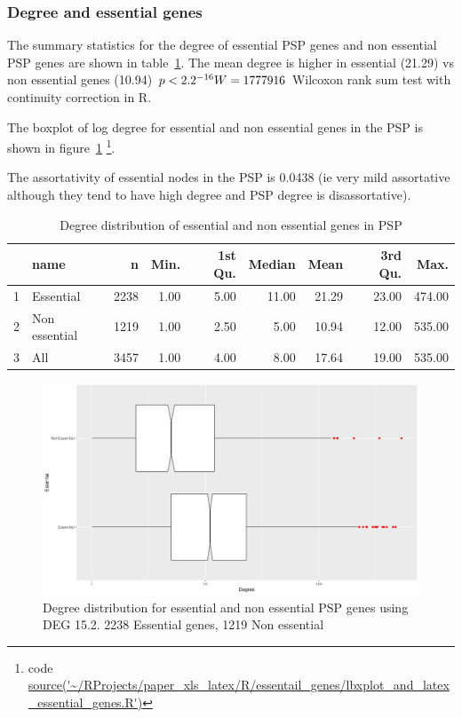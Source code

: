 \subsubsection{Degree and essential genes}

The summary statistics for the degree of essential PSP genes and non essential PSP genes are shown in table~\ref{tab:degree distribution essential and non essential genes PSP}. The mean degree is higher in essential (21.29) vs non essential genes (10.94) $p<2.2 \time 10^{-16}   W=1777916$ Wilcoxon rank sum test with continuity correction in R.

The boxplot of log degree for essential and non essential genes in the PSP is shown in figure~\ref{fig:boxplot_log degree essential genes}
\footnote{code \url{source('~/RProjects/paper_xls_latex/R/essentail_genes/lbxplot_and_latex_essential_genes.R')}}.

The assortativity of essential nodes in the PSP is 0.0438 (ie very mild assortative although they tend to have high degree and PSP degree is disassortative).


\begin{table}[ht]
\centering
\begin{tabular}{rlrrrrrrr}
  \hline
 & name & n & Min. & 1st Qu. & Median & Mean & 3rd Qu. & Max. \\ 
  \hline
1 & Essential & 2238 & 1.00 & 5.00 & 11.00 & 21.29 & 23.00 & 474.00 \\ 
  2 & Non essential & 1219 & 1.00 & 2.50 & 5.00 & 10.94 & 12.00 & 535.00 \\ 
  3 & All & 3457 & 1.00 & 4.00 & 8.00 & 17.64 & 19.00 & 535.00 \\ 
   \hline
\end{tabular}
\caption{Degree distribution of essential and non essential genes in PSP}
\label{tab:degree distribution essential and non essential genes PSP}
\end{table}

\begin{figure}
    \centering
    \includegraphics[width=\textwidth]{images/Rplot_essential_non_essential_gene_degree.png}
    \caption{Degree distribution for essential and non essential PSP genes using DEG 15.2. 2238 Essential genes, 1219 Non essential}
    \label{fig:boxplot_log degree essential genes}
\end{figure}



